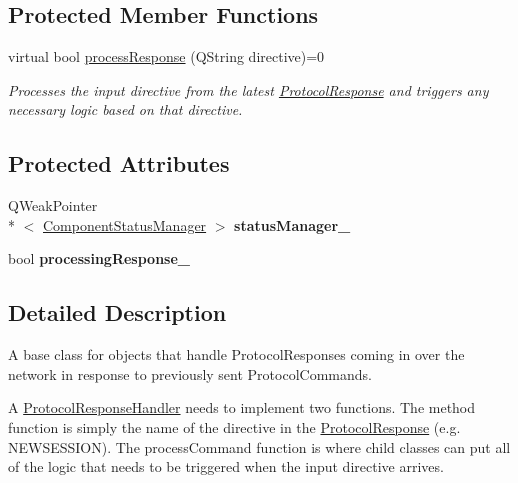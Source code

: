 \subsection*{Protected Member Functions}
\begin{DoxyCompactItemize}
\item 
virtual bool \hyperlink{struct_picto_1_1_protocol_response_handler_a91333b76cb524cde73bdb7e3e4d1e8be}{process\-Response} (Q\-String directive)=0
\begin{DoxyCompactList}\small\item\em Processes the input directive from the latest \hyperlink{struct_picto_1_1_protocol_response}{Protocol\-Response} and triggers any necessary logic based on that directive. \end{DoxyCompactList}\end{DoxyCompactItemize}
\subsection*{Protected Attributes}
\begin{DoxyCompactItemize}
\item 
\hypertarget{struct_picto_1_1_protocol_response_handler_ab2deea4724a127c5a0e476f51d01f89a}{Q\-Weak\-Pointer\\*
$<$ \hyperlink{class_component_status_manager}{Component\-Status\-Manager} $>$ {\bfseries status\-Manager\-\_\-}}\label{struct_picto_1_1_protocol_response_handler_ab2deea4724a127c5a0e476f51d01f89a}

\item 
\hypertarget{struct_picto_1_1_protocol_response_handler_a3755adf51684abb0426a0b54060e289f}{bool {\bfseries processing\-Response\-\_\-}}\label{struct_picto_1_1_protocol_response_handler_a3755adf51684abb0426a0b54060e289f}

\end{DoxyCompactItemize}


\subsection{Detailed Description}
A base class for objects that handle Protocol\-Responses coming in over the network in response to previously sent Protocol\-Commands. 

A \hyperlink{struct_picto_1_1_protocol_response_handler}{Protocol\-Response\-Handler} needs to implement two functions. The method function is simply the name of the directive in the \hyperlink{struct_picto_1_1_protocol_response}{Protocol\-Response} (e.\-g. N\-E\-W\-S\-E\-S\-S\-I\-O\-N). The process\-Command function is where child classes can put all of the logic that needs to be triggered when the input directive arrives.

